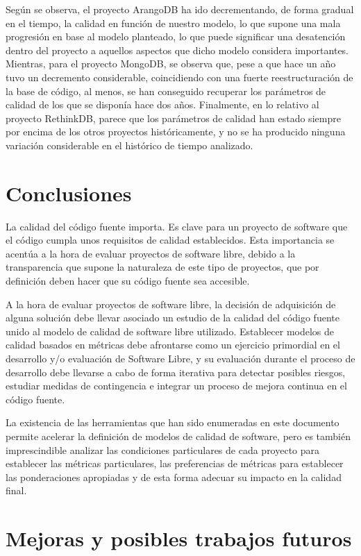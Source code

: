 \documentclass[11pt]{article}
\begin{document}
Según se observa, el proyecto ArangoDB ha ido decrementando, de forma gradual en el tiempo, la calidad en función de nuestro modelo, lo que supone una mala progresión en base al modelo planteado, lo que puede significar una desatención dentro del proyecto a aquellos aspectos que dicho modelo considera importantes. Mientras, para el proyecto MongoDB, se observa que, pese a que hace un año tuvo un decremento considerable, coincidiendo con una fuerte reestructuración de la base de código, al menos, se han conseguido recuperar los parámetros de calidad de los que se disponía hace dos años. Finalmente, en lo relativo al proyecto RethinkDB, parece que los parámetros de calidad han estado siempre por encima de los otros proyectos históricamente, y no se ha producido ninguna variación considerable en el histórico de tiempo analizado.

\section{Conclusiones}
\label{sec:conclussions}

La calidad del código fuente importa. Es clave para un proyecto de software que el código cumpla unos requisitos de calidad establecidos. Esta importancia se acentúa a la hora de evaluar proyectos de software libre, debido a la transparencia que supone la naturaleza de este tipo de proyectos, que por definición deben hacer que su código fuente sea accesible.

A la hora de evaluar proyectos de software libre, la decisión de adquisición de alguna solución debe llevar asociado un estudio de la calidad del código fuente unido al modelo de calidad de software libre utilizado. Establecer modelos de calidad basados en métricas debe afrontarse como un ejercicio primordial en el desarrollo y/o evaluación de Software Libre, y su evaluación durante el proceso de desarrollo debe llevarse a cabo de forma iterativa para detectar posibles riesgos, estudiar medidas de contingencia e integrar un proceso de mejora continua en el código fuente.

La existencia de las herramientas que han sido enumeradas en este documento permite acelerar la definición de modelos de calidad de software, pero es también imprescindible analizar las condiciones particulares de cada proyecto para establecer las métricas particulares, las preferencias de métricas para establecer las ponderaciones apropiadas y de esta forma adecuar su impacto en la calidad final.

\section{Mejoras y posibles trabajos futuros}
\end{document}
